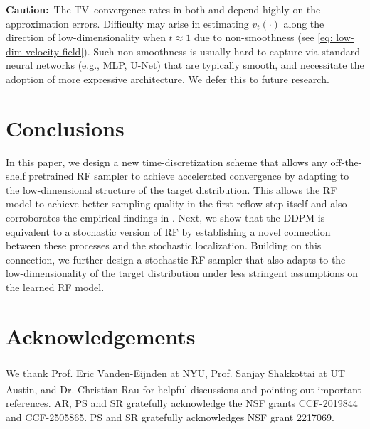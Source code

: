 \documentclass{article}
\theoremstyle{plain}
\theoremstyle{definition}
\theoremstyle{remark}
\def\TV{{\sf TV}}
\begin{document}
\textbf{Caution:}~The \TV~convergence rates in both  and  depend highly on the approximation errors. 
Difficulty may arise in estimating $v_{t}(\cdot)$ along the direction of low-dimensionality when $t \approx 1$ due to non-smoothness (see \eqref{eq: low-dim velocity field}). Such non-smoothness is usually hard to capture via standard neural networks (e.g., MLP, U-Net) that are typically smooth, and necessitate the adoption of more expressive architecture. We defer this to future research.



\section{Conclusions}
In this paper, we design a new time-discretization scheme that allows any off-the-shelf pretrained RF sampler to achieve accelerated convergence by adapting to the low-dimensional structure of the target distribution. This allows the RF model to achieve better sampling quality in the first reflow step itself and also corroborates the empirical findings in \citet{lee2024improvingtrainingrectifiedflows}. Next, we show that the DDPM is equivalent to a stochastic version of RF by establishing a novel connection between these processes and the stochastic localization. Building on this connection, we further design a stochastic RF sampler that also adapts to
the low-dimensionality of the target distribution under less stringent assumptions on the learned RF model. 





\section*{Acknowledgements}
We thank Prof. Eric Vanden-Eijnden\textsuperscript{} at NYU, Prof. Sanjay Shakkottai\textsuperscript{} at UT Austin, and Dr. Christian Rau\textsuperscript{} for helpful discussions and pointing out important references. AR, PS and SR gratefully acknowledge the NSF grants CCF-2019844 and CCF-2505865. PS and SR gratefully acknowledges NSF grant 2217069.
\end{document}
